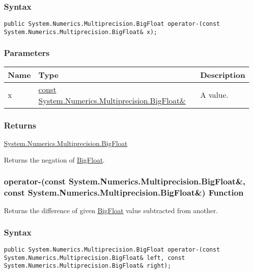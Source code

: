 \documentclass[a4paper,oneside,11.000000pt]{book}
\begin{document}
\subsubsection*{Syntax}
\texttt{public System.Numerics.Multiprecision.BigFloat operator-(const System.Numerics.Multiprecision.BigFloat\& x);}
\subsubsection*{Parameters}
\begin{flushleft}
\begin{supertabular}[l]{!{\raggedright}p{1.30721cm}!{\raggedright}p{8.55945cm}!{\raggedright}p{2.65538cm}}
\textbf{Name}
& \textbf{Type}
& \textbf{Description}
\\
\hline
x
& \hyperlink{System.Numerics.Multiprecision.BigFloat}{const System.\-Numerics.\-Multiprecision.\-BigFloat\&\-}
& A value.

\\
\end{supertabular}

\end{flushleft}
\subsubsection*{Returns}
\hyperlink{System.Numerics.Multiprecision.BigFloat}{System.\-Numerics.\-Multiprecision.\-BigFloat}
\begin{flushleft}
Returns the negation of \hyperlink{System.Numerics.Multiprecision.BigFloat}{BigFloat}.

\end{flushleft}
\clearpage

\hypertarget{System.Numerics.Multiprecision.operator.minus.C.R.System.Numerics.Multiprecision.BigFloat.C.R.System.Numerics.Multiprecision.BigFloat}{\subsubsection*{operator-(const System.Numerics.Multiprecision.BigFloat\&, const System.Numerics.Multiprecision.BigFloat\&) Function}}
\begin{flushleft}
Returns the difference of given \hyperlink{System.Numerics.Multiprecision.BigFloat}{BigFloat} value subtracted from another.

\end{flushleft}
\subsubsection*{Syntax}
\texttt{public System.Numerics.Multiprecision.BigFloat operator-(const System.Numerics.Multiprecision.BigFloat\& left, const System.Numerics.Multiprecision.BigFloat\& right);}
\end{document}
